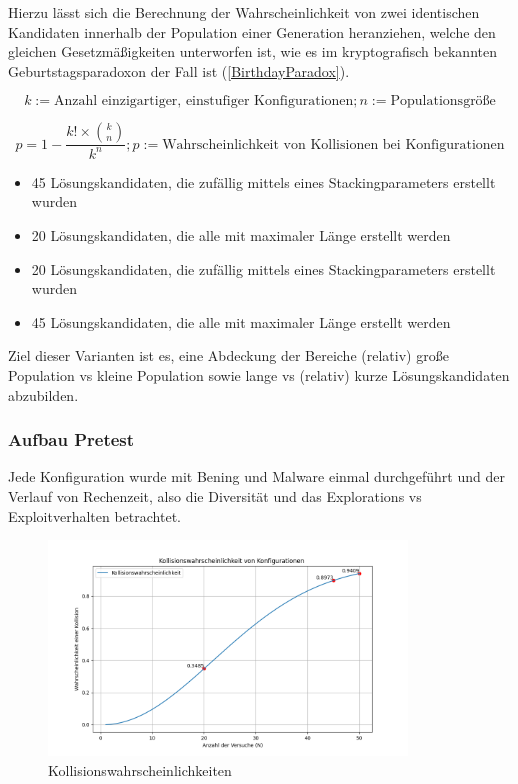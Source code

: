 Hierzu lässt sich die Berechnung der Wahrscheinlichkeit von zwei identischen Kandidaten innerhalb der Population einer Generation heranziehen, welche den gleichen Gesetzmäßigkeiten unterworfen ist, wie es im kryptografisch bekannten Geburtstagsparadoxon der Fall ist (\ref{BirthdayParadox}).
\begin{float}
    
\begin{equation}
    k := \text{Anzahl einzigartiger, einstufiger Konfigurationen}; 
    n := \text{Populationsgröße}
\end{equation}


\begin{equation}
    \label{BirthdayParadox} 
    p = 1 - \frac{k! \times \binom{k}{n}}{k^{n}}; p := \text{Wahrscheinlichkeit von Kollisionen bei Konfigurationen}
\end{equation}
\end{float}


\begin{itemize}
    \item 45 Lösungskandidaten, die zufällig mittels eines Stackingparameters erstellt wurden 
    \item 20 Lösungskandidaten, die alle mit maximaler Länge erstellt werden
    \item 20 Lösungskandidaten, die zufällig mittels eines Stackingparameters erstellt wurden
    \item 45 Lösungskandidaten, die alle mit maximaler Länge erstellt werden
\end{itemize}
Ziel dieser Varianten ist es, eine Abdeckung der Bereiche (relativ) große Population vs kleine Population sowie lange vs (relativ) kurze Lösungskandidaten abzubilden.
\subsubsection{Aufbau Pretest}
Jede Konfiguration wurde mit Bening und Malware einmal durchgeführt und der Verlauf von Rechenzeit, also die Diversität und das Explorations vs Exploitverhalten betrachtet.
\begin{figure}[h]
    \centering
    \includegraphics[width=0.85\textwidth]{gfx/Abbildungen/Kollisionswahrscheinlichkeit.png}
    \caption{Kollisionswahrscheinlichkeiten}
    \label{fig:mutations}
\end{figure}

